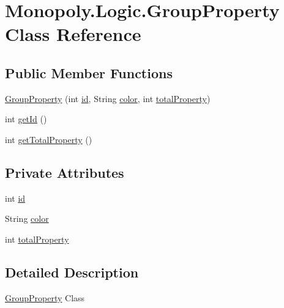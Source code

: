 \hypertarget{class_monopoly_1_1_logic_1_1_group_property}{}\section{Monopoly.\+Logic.\+Group\+Property Class Reference}
\label{class_monopoly_1_1_logic_1_1_group_property}
\subsection*{Public Member Functions}
\begin{DoxyCompactItemize}
\item 
\hyperlink{class_monopoly_1_1_logic_1_1_group_property_a6ba2b00903d1db5717d0c487ec80bb1a}{Group\+Property} (int \hyperlink{class_monopoly_1_1_logic_1_1_group_property_ae78e270b84f150cbd7ba6dfd73796d37}{id}, String \hyperlink{class_monopoly_1_1_logic_1_1_group_property_a88784239d8d2409772fec1d91d8a4269}{color}, int \hyperlink{class_monopoly_1_1_logic_1_1_group_property_a1539ca57fe37b36bc493f8f37c4b946d}{total\+Property})
\item 
int \hyperlink{class_monopoly_1_1_logic_1_1_group_property_a2f025ab9411ea35b130d429a1f8a2650}{get\+Id} ()
\item 
int \hyperlink{class_monopoly_1_1_logic_1_1_group_property_aaf2a61b884cec107cbd34f5d55f3033b}{get\+Total\+Property} ()
\end{DoxyCompactItemize}
\subsection*{Private Attributes}
\begin{DoxyCompactItemize}
\item 
int \hyperlink{class_monopoly_1_1_logic_1_1_group_property_ae78e270b84f150cbd7ba6dfd73796d37}{id}
\item 
String \hyperlink{class_monopoly_1_1_logic_1_1_group_property_a88784239d8d2409772fec1d91d8a4269}{color}
\item 
int \hyperlink{class_monopoly_1_1_logic_1_1_group_property_a1539ca57fe37b36bc493f8f37c4b946d}{total\+Property}
\end{DoxyCompactItemize}


\subsection{Detailed Description}
\hyperlink{class_monopoly_1_1_logic_1_1_group_property}{Group\+Property} Class 

